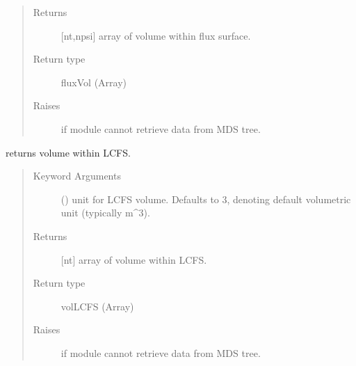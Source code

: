 \documentclass[letterpaper,10pt,english]{sphinxmanual}
\begin{document}
\begin{fulllineitems}
\begin{fulllineitems}
\begin{quote}
\begin{description}
\item[{Returns}] \leavevmode
{[}nt,npsi{]} array of volume within flux surface.

\item[{Return type}] \leavevmode
fluxVol (Array)

\item[{Raises}] \leavevmode
{} \textendash{} if module cannot retrieve data from MDS tree.

\end{description}\end{quote}

\end{fulllineitems}


\begin{fulllineitems}
\label{\detokenize{eqtools:eqtools.TCVLIUQE.TCVLIUQETree.getVolLCFS}}
returns volume within LCFS.
\begin{quote}\begin{description}
\item[{Keyword Arguments}] \leavevmode
{} () \textendash{} unit for LCFS volume.  Defaults to 3,
denoting default volumetric unit (typically m\textasciicircum{}3).

\item[{Returns}] \leavevmode
{[}nt{]} array of volume within LCFS.

\item[{Return type}] \leavevmode
volLCFS (Array)

\item[{Raises}] \leavevmode
{} \textendash{} if module cannot retrieve data from MDS tree.

\end{description}\end{quote}

\end{fulllineitems}



\end{fulllineitems}
\end{document}
